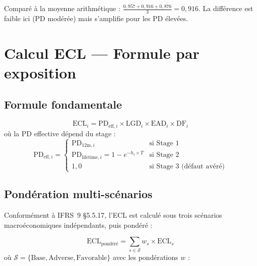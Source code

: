 \documentclass[12pt,a4paper]{article}
\begin{document}
Compar\'e \`a la moyenne arithm\'etique : $\frac{0{,}957 + 0{,}916 + 0{,}876}{3} = 0{,}916$. La diff\'erence est faible ici (PD mod\'er\'ee) mais s'amplifie pour les PD \'elev\'ees.

\newpage
\section{Calcul ECL --- Formule par exposition}
\label{sec:ecl}

\subsection{Formule fondamentale}

\begin{formulebox}
\begin{equation}
\label{eq:ecl}
\boxed{\text{ECL}_i = \text{PD}_{\text{eff},i} \times \text{LGD}_i \times \text{EAD}_i \times \text{DF}_i}
\end{equation}
o\`u la PD effective d\'epend du stage :
\begin{equation}
\text{PD}_{\text{eff},i} = \begin{cases}
\text{PD}_{12\text{m},i} & \text{si Stage 1} \\
\text{PD}_{\text{lifetime},i} = 1 - e^{-h_i \times T} & \text{si Stage 2} \\
1{,}0 & \text{si Stage 3 (d\'efaut av\'er\'e)}
\end{cases}
\end{equation}
\end{formulebox}

\subsection{Pond\'eration multi-sc\'enarios}

Conform\'ement \`a IFRS~9 \S5.5.17, l'ECL est calcul\'e sous trois sc\'enarios macro\'economiques ind\'ependants, puis pond\'er\'e :

\begin{formulebox}
\begin{equation}
\label{eq:ecl_weighted}
\text{ECL}_{\text{pond\'er\'e}} = \sum_{s \in \mathcal{S}} w_s \times \text{ECL}_s
\end{equation}
o\`u $\mathcal{S} = \{\text{Base}, \text{Adverse}, \text{Favorable}\}$ avec les pond\'erations $w$ :
\end{formulebox}
\end{document}

